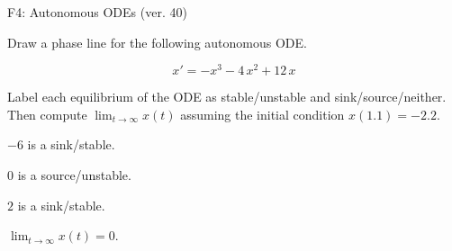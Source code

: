 \begin{exercise}
  \begin{exerciseTitle}F4: Autonomous ODEs (ver. 40)\end{exerciseTitle}
  \begin{exerciseStatement}
    

      Draw a phase line for the following 
      autonomous ODE.
    

    
\[x'= -x^{3} - 4 \, x^{2} + 12 \, x\]

    

      Label each equilibrium of the ODE
      as stable/unstable and sink/source/neither.
      Then compute \(\lim_{t\to\infty}x(t)\)
      assuming the initial condition
      \(x( 1.1 )= -2.2\).
    

  \end{exerciseStatement}
  \begin{exerciseAnswer}
    

      \(-6\) is a sink/stable.
      
        \(0\) is a source/unstable.
      
      \(2\) is a sink/stable.
    

    

      \(\lim_{t\to\infty}x(t)=0\).
    

  \end{exerciseAnswer}
\end{exercise}